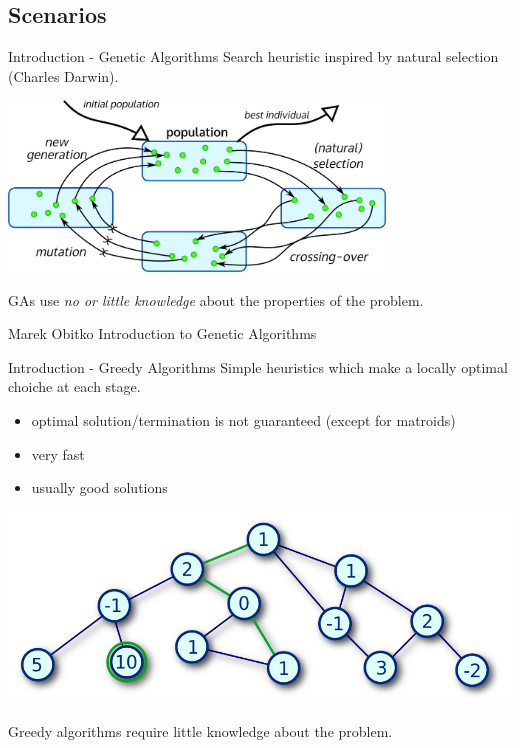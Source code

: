\documentclass{beamer}
\begin{document}
\subsection{Scenarios}
\begin{frame}{Introduction - Genetic Algorithms}
  Search heuristic inspired by natural selection (Charles Darwin).
  \begin{center}
   \includegraphics[width=0.75\textwidth]{images/genetic-algorithms}
  \end{center}
  GAs use \emph{no or little knowledge} about the properties of the problem.
  \footnotesize{
    \begin{thebibliography}{99}
       Marek Obitko
      \newblock Introduction to Genetic Algorithms
    \end{thebibliography}
  }
\end{frame}


\begin{frame}{Introduction - Greedy Algorithms}
  Simple heuristics which make a locally optimal choiche at each stage.
  \begin{itemize}
    \item optimal solution/termination is not guaranteed (except for matroids)
    \item very fast
    \item usually good solutions
  \end{itemize}
  \begin{center}
    \includegraphics[height=0.4\textheight]{images/greedy}
  \end{center}
  Greedy algorithms require little knowledge about the problem.
\end{frame}
\end{document}
